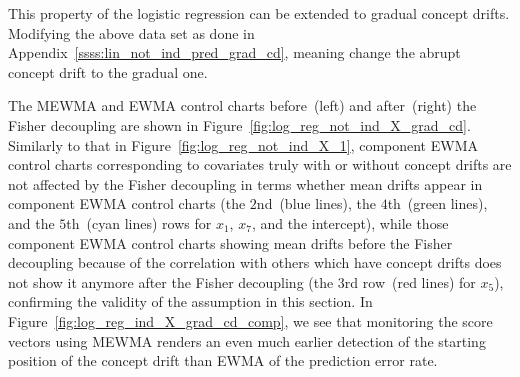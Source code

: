 \documentclass[twoside,11pt]{article}
\begin{document}
\begin{appendices}
This property of the logistic regression can be extended to gradual concept drifts. Modifying the above data set as done in Appendix~\ref{ssss:lin_not_ind_pred_grad_cd}, meaning change the abrupt concept drift to the gradual one.

The MEWMA and EWMA control charts before~(left) and after~(right) the Fisher decoupling are shown in Figure~\ref{fig:log_reg_not_ind_X_grad_cd}. Similarly to that in Figure~\ref{fig:log_reg_not_ind_X_1}, component EWMA control charts corresponding to covariates truly with or without concept drifts are not affected by the Fisher decoupling in terms whether mean drifts appear in component EWMA control charts (the $2$nd~(blue lines), the $4$th~(green lines), and the $5$th~(cyan lines) rows for $x_1$, $x_7$, and the intercept), while those component EWMA control charts showing mean drifts before the Fisher decoupling because of the correlation with others which have concept drifts does not show it anymore after the Fisher decoupling (the $3$rd row~(red lines) for $x_5$), confirming the validity of the assumption in this section. In Figure~\ref{fig:log_reg_ind_X_grad_cd_comp}, we see that monitoring the score vectors using MEWMA renders an even much earlier detection of the starting position of the concept drift than EWMA of the prediction error rate.


\end{appendices}
\end{document}
